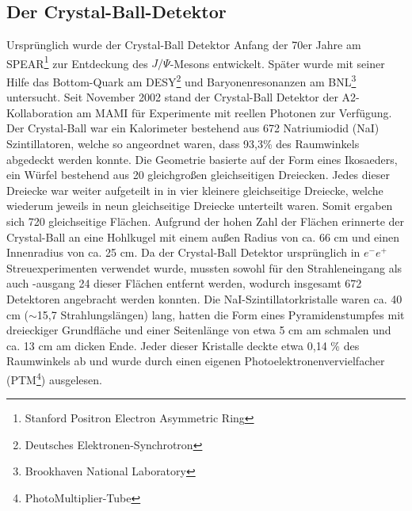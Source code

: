 \documentclass[a4paper,11pt,oneside,final,german,openbib,pdftex]{scrbook}
\begin{document}
\subsection{Der Crystal-Ball-Detektor}
Ursprünglich wurde der Crystal-Ball Detektor Anfang der 70er Jahre am SPEAR\footnote{Stanford Positron Electron Asymmetric Ring} zur Entdeckung des $J/\Psi$-Mesons entwickelt. Später wurde mit seiner Hilfe das Bottom-Quark am DESY\footnote{Deutsches Elektronen-Synchrotron} und Baryonenresonanzen am BNL\footnote{Brookhaven National Laboratory} untersucht.
Seit November 2002 stand der Crystal-Ball Detektor der A2-Kollaboration am MAMI für Experimente mit reellen Photonen zur Verfügung.
\newline
Der Crystal-Ball war ein Kalorimeter bestehend aus 672 Natriumiodid (NaI) Szintillatoren, welche so angeordnet waren, dass 93,3\% des Raumwinkels abgedeckt werden konnte. 
Die Geometrie basierte auf der Form eines Ikosaeders, ein W\"urfel bestehend aus 20 gleichgro{\ss}en  gleichseitigen Dreiecken. Jedes dieser Dreiecke war weiter aufgeteilt in in vier kleinere gleichseitige Dreiecke, welche wiederum jeweils in neun gleichseitige Dreiecke unterteilt waren. Somit ergaben sich 720 gleichseitige Fl\"achen. Aufgrund der hohen Zahl der Fl\"achen erinnerte der Crystal-Ball an eine Hohlkugel mit einem au{\ss}en Radius von ca. 66 cm und einen Innenradius von ca. 25 cm. Da der Crystal-Ball Detektor urspr\"unglich in $e^-e^+$ Streuexperimenten verwendet wurde, mussten sowohl f\"ur den Strahleneingang als auch -ausgang 24 dieser Fl\"achen entfernt werden, wodurch insgesamt 672 Detektoren angebracht werden konnten. Die NaI-Szintillatorkristalle waren ca. 40 cm ($\sim$15,7 Strahlungsl\"angen) lang, hatten die Form eines Pyramidenstumpfes mit dreieckiger Grundfl\"ache und einer Seitenl\"ange von etwa 5 cm am schmalen und ca. 13 cm am dicken Ende. Jeder dieser Kristalle deckte etwa 0,14 \% des Raumwinkels ab und wurde durch einen eigenen Photoelektronenvervielfacher (PTM\footnote{PhotoMultiplier-Tube}) ausgelesen. 
\end{document}
